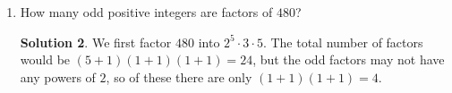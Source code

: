 \documentclass{article}
\theoremstyle{definition}
\newtheorem*{solution}{Solution}
\begin{document}
\begin{enumerate}
\begin{solution}
            numbers. We can simplify this particular problem as shown. \\
            Numerator:
            \begin{align*}
                8! \hspace{0.525cm} - 7 \cdot \hspace{0.1cm} 7! \hspace{0.07cm} + 6 \cdot 6! & \\
                \overbrace{8 \cdot 7 \cdot 6!} - 7 \cdot \overbrace{7 \cdot 6!} + 6 \cdot 6! &= 
                \hspace{0.25cm} 6! \hspace{0.25cm} \cdot \hspace{0.25cm} \underbrace{8 \cdot 7 - 7 \cdot 7 + 6} \\
                &= \overbrace{6 \cdot 5!} \hspace{0.675cm} \cdot \hspace{0.675cm} 13
            \end{align*}
            Denominator:
            \begin{align*}
                7! \hspace{0.525cm} - 6 \cdot \hspace{0.1cm} 6! \hspace{0.07cm} + 5 \cdot 5! & \\
                \overbrace{7 \cdot 6 \cdot 5!} - 6 \cdot \overbrace{6 \cdot 5!} + 5 \cdot 5! &= 
                5! \hspace{0.25cm} \cdot \hspace{0.25cm} \underbrace{7 \cdot 6 - 6 \cdot 6 + 5} \\
                &= 5! \hspace{0.725cm} \cdot \hspace{0.725cm} 11
            \end{align*}
            So, the original expression equals $\frac{6 \cdot 5! \cdot 13}{5! \cdot 11} =
            6 \cdot \frac{13}{11} = \frac{78}{11}$.
        \end{solution}
        \item How many odd positive integers are factors of $480$?
        \begin{solution}
            We first factor $480$ into $2^5 \cdot 3 \cdot 5$. The total number of factors would be
            $(5 + 1)(1 + 1)(1 + 1) = 24$, but the odd factors may not have any powers of $2$, so of
            these there are only $(1 + 1)(1 + 1) = 4$.
        \end{solution}
    \end{enumerate}
\end{document}
